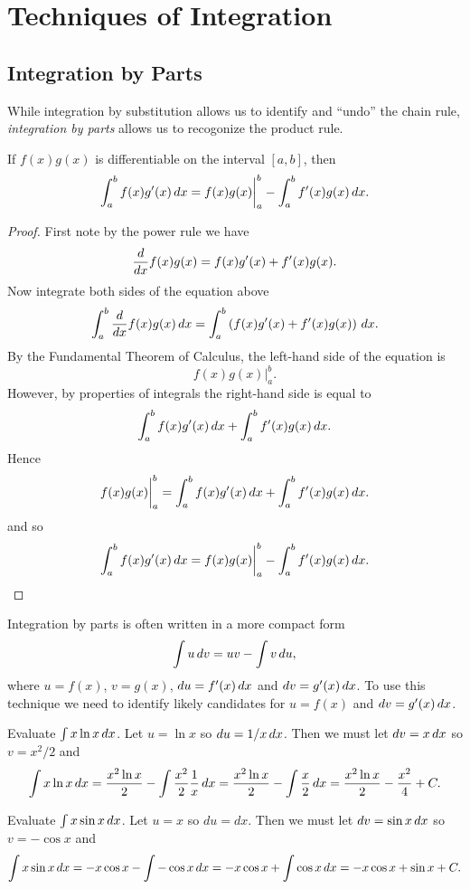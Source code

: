 \chapter{Techniques of Integration}

\section{Integration by Parts}

While integration by substitution allows us to identify and ``undo''
the chain rule, \textit{integration by parts} allows us to recogonize
the product rule.

\begin{mainTheorem} 
If $f(x)g(x)$ is differentiable on the interval $[a,b]$, then
\[
\int_a^b f(x) g'(x) \, d x =f(x)g(x) \bigg|_a^b - \int_a^b f'(x) g(x) \, d x.
\]
\end{mainTheorem}
\begin{proof} First note by the power rule we have
\[
\frac{d}{dx} f(x)g(x) = f(x)g'(x) + f'(x) g(x).
\]
Now integrate both sides of the equation above
\[
\int_a^b \frac{d}{dx} f(x) g(x) \, d x = \int_a^b \left(f(x)g'(x) + f'(x) g(x)\right) \, d x.
\]
By the Fundamental Theorem of Calculus, the left-hand side of the equation is
\[
f(x)g(x) \bigg|_a^b.
\]
However, by properties of integrals the right-hand side is equal to 
\[
\int_a^b f(x)g'(x)\, d x + \int_a^b f'(x) g(x) \, d x.
\]
Hence
\[
f(x)g(x) \bigg|_a^b = \int_a^b f(x)g'(x)\, d x + \int_a^b f'(x) g(x) \, d x.
\]
and so 
\[
 \int_a^b f(x)g'(x)\, d x = f(x)g(x) \bigg|_a^b -  \int_a^b f'(x) g(x) \, d x.
\]
\end{proof}


Integration by parts is often written in a more compact form
\[
\int u\, d v = uv-\int v\, d u,
\]
where $u=f(x)$, $v=g(x)$, $du=f'(x)\, d x$ and $dv=g'(x)\, d x$.  To use
this technique we need to identify likely candidates for $u=f(x)$ and
$dv=g'(x)\, d x$.

\begin{example}
Evaluate $\int x\ln x\, d x$. Let $u=\ln x$ so $du=1/x\, d x$. Then
we must let $dv=x\, d x$ so $v=x^2/2$ and
$$
 \int x\ln x\, d x={x^2\ln x\over 2}-\int {x^2\over2}{1\over x}\, d x=
 {x^2\ln x\over 2}-\int {x\over2}\, d x={x^2\ln x\over 2}-{x^2\over4}+C.
$$
\end{example}

\begin{example}
Evaluate $\int x\sin x\, d x$. Let $u=x$ so $du=dx$. Then
we must let $dv=\sin x\, d x$ so $v=-\cos x$ and
$$\int x\sin x\, d x=-x\cos x-\int -\cos x\, d x=
-x\cos x+\int \cos x\, d x=-x\cos x+\sin x+C.$$
\end{example}

